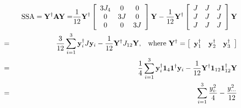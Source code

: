 \documentclass{article}
\begin{document}
\begin{eqnarray*}
&\therefore &\text{SSA}=\mathbf{Y}^{\dagger }\mathbf{AY=}\frac{1}{12}\mathbf{%
Y}^{\dagger }\left[ 
\begin{array}{ccc}
3J_{4} & 0 & 0 \\ 
0 & 3J & 0 \\ 
0 & 0 & 3J%
\end{array}%
\right] \mathbf{Y}-\frac{1}{12}\mathbf{Y}^{\dagger }\left[ 
\begin{array}{ccc}
J & J & J \\ 
J & J & J \\ 
J & J & J%
\end{array}%
\right] \mathbf{Y} \\
&=&\frac{3}{12}\sum\limits_{i=1}^{3}\mathbf{y}_{i}^{\dagger }J\mathbf{y}_{i}-%
\frac{1}{12}\mathbf{Y}^{\dagger }J_{12}\mathbf{Y,}\text{ where }\mathbf{Y}%
^{\dagger }=\left[ 
\begin{array}{ccc}
\mathbf{y}_{1}^{\dagger } & \mathbf{y}_{2}^{\dagger } & \mathbf{y}%
_{3}^{\dagger }%
\end{array}%
\right] \\
&=&\frac{1}{4}\sum\limits_{i=1}^{3}\mathbf{y}_{i}^{\dagger }\mathbf{1}_{4}%
\mathbf{1}^{\dagger }\mathbf{y}_{i}-\frac{1}{12}\mathbf{Y}^{\dagger }\mathbf{%
1}_{12}\mathbf{1}_{12}^{\dagger }\mathbf{Y} \\
&=&\sum\limits_{i=1}^{3}\frac{y_{i\cdot }^{2}}{4}-\frac{y_{\cdot \cdot \cdot
}^{2}}{12}
\end{eqnarray*}
\end{document}
